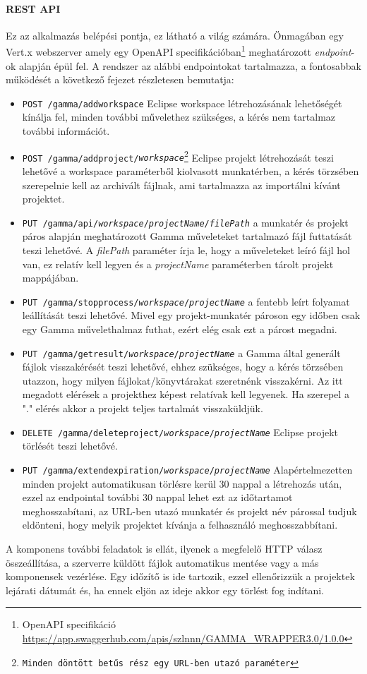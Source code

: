\paragraph{REST API} Ez az alkalmazás belépési pontja, ez látható a világ számára. Önmagában egy Vert.x webszerver amely egy OpenAPI specifikációban\footnote{OpenAPI specifikáció \url{https://app.swaggerhub.com/apis/szlnnn/GAMMA_WRAPPER3.0/1.0.0}} meghatározott \textit{endpoint}-ok alapján épül fel. A rendszer az alábbi endpointokat tartalmazza, a fontosabbak működését a következő fejezet részletesen bemutatja:
\begin{itemize}
	\item \texttt{POST /gamma/addworkspace} Eclipse workspace létrehozásának lehetőségét kínálja fel, minden további művelethez szükséges, a kérés nem tartalmaz további információt.
	\item \texttt{POST /gamma/addproject/{\textit{workspace}}\footnote{Minden döntött betűs rész egy URL-ben utazó paraméter}} Eclipse projekt létrehozását teszi lehetővé a {workspace} paraméterből kiolvasott munkatérben, a kérés törzsében szerepelnie kell az archivált fájlnak, ami tartalmazza az importálni kívánt projektet.
	\item \texttt{PUT /gamma/api/{\textit{workspace}}/{\textit{projectName}}/{\textit{filePath}}} a munkatér és projekt páros alapján meghatározott Gamma műveleteket tartalmazó fájl futtatását teszi lehetővé. A {\textit{filePath}} paraméter írja le, hogy a műveleteket leíró fájl hol van, ez relatív kell legyen és a {\textit{projectName}} paraméterben tárolt projekt mappájában.
	\item \texttt{PUT /gamma/stopprocess/{\textit{workspace}}/{\textit{projectName}}} a fentebb leírt folyamat leállítását teszi lehetővé. Mivel egy projekt-munkatér pároson egy időben csak egy Gamma művelethalmaz futhat, ezért elég csak ezt a párost megadni.
	\item \texttt{PUT /gamma/getresult/{\textit{workspace}}/{\textit{projectName}}} a Gamma által generált fájlok visszakérését teszi lehetővé, ehhez szükséges, hogy a kérés törzsében utazzon, hogy milyen fájlokat/könyvtárakat szeretnénk visszakérni. Az itt megadott elérések a projekthez képest relatívak kell legyenek. Ha szerepel a "." elérés akkor a projekt teljes tartalmát visszaküldjük.
	\item \texttt{DELETE /gamma/deleteproject/{\textit{workspace}}/{\textit{projectName}}} Eclipse projekt törlését teszi lehetővé.
	\item \texttt{PUT /gamma/extendexpiration/{\textit{workspace}}/{\textit{projectName}}} Alapértelmezetten minden projekt automatikusan törlésre kerül 30 nappal a létrehozás után, ezzel az endpointal további 30 nappal lehet ezt az időtartamot meghosszabítani, az URL-ben utazó munkatér és projekt név párossal tudjuk eldönteni, hogy melyik projektet kívánja a felhasználó meghosszabbítani.
\end{itemize}
A komponens további feladatok is ellát, ilyenek a megfelelő HTTP válasz összeállítása, a szerverre küldött fájlok automatikus mentése vagy a más komponensek vezérlése. Egy időzítő is ide tartozik, ezzel ellenőrizzük a projektek lejárati dátumát és, ha ennek eljön az ideje akkor egy törlést fog indítani.

